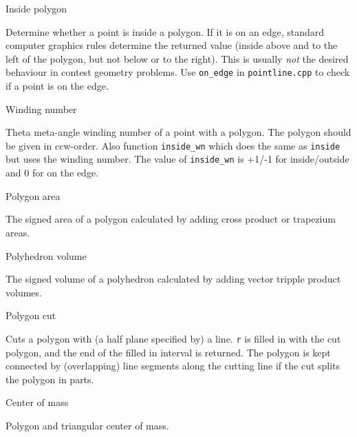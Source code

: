 \begin{algorithm}{Inside polygon}

\desc
Determine whether a point is inside a polygon. If it is on an edge,
standard computer graphics rules determine the returned value (inside above
and to the left of the polygon, but not below or to the right).
This is usually \emph{not} the desired behaviour in contest geometry problems.
Use {\tt on\_edge} in {\tt pointline.cpp} to check if a point is on the edge.
\end{algorithm}

\begin{algorithm}{Winding number}

\desc
Theta meta-angle winding number of a point with a polygon. The polygon should
be given in ccw-order. Also function {\tt inside\_wn} which does the same as
{\tt inside} but uses the winding number. The value of {\tt inside\_wn} is
+1/-1 for inside/outside and 0 for on the edge.
\end{algorithm}

\begin{algorithm}{Polygon area}

\desc
The signed area of a polygon calculated by adding cross product or
trapezium areas.
\end{algorithm}

\begin{algorithm}{Polyhedron volume}

\desc
The signed volume of a polyhedron calculated by adding vector tripple
product volumes.
\end{algorithm}

\begin{algorithm}{Polygon cut}

\desc
Cuts a polygon with (a half plane specified by) a line.
{\tt r} is filled in with the cut polygon, and the end of the filled in
interval is returned. The polygon is kept connected by (overlapping)
line segments along the cutting line if the cut splits the polygon in parts.
\end{algorithm}


\begin{algorithm}{Center of mass}

\desc
Polygon and triangular center of mass.
\end{algorithm}
